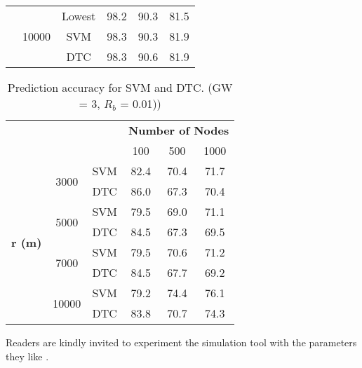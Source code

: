 \begin{table}[h]
\begin{tabular}{|c|c|c|c|c|c|}
                                 & \multirow{3}{*}{10000} & Lowest & 98.2          & 90.3          & 81.5          \\ \cline{3-6}
                                 &                        & SVM    & 98.3          & 90.3          & 81.9          \\ \cline{3-6}
                                 &                        & DTC    & 98.3          & 90.6          & 81.9          \\ \hline
\end{tabular}
\end{table}

\begin{table}[h]
\centering
\caption{Prediction accuracy for SVM and DTC. (GW = 3, ${R_{b}}$ = 0.01))}
\label{table:prediction_accuracy}
\begin{tabular}{|c|c|c|c|c|c|}
\hline
\multicolumn{3}{|c|}{\multirow{2}{*}{}}                        & \multicolumn{3}{c|}{\textbf{Number of Nodes}} \\ \cline{4-6}
\multicolumn{3}{|c|}{}                                         & 100           & 500           & 1000          \\ \hline
\multirow{8}{*}{\textbf{r (m)}} & \multirow{2}{*}{3000}  & SVM & 82.4          & 70.4          & 71.7          \\ \cline{3-6}
                                &                        & DTC & 86.0          & 67.3          & 70.4          \\ \cline{2-6}

                                & \multirow{2}{*}{5000}  & SVM & 79.5          & 69.0          & 71.1          \\ \cline{3-6}
                                &                        & DTC & 84.5          & 67.3          & 69.5          \\ \cline{2-6}

                                & \multirow{2}{*}{7000}  & SVM & 79.5          & 70.6          & 71.2          \\ \cline{3-6}
                                &                        & DTC & 84.5          & 67.7          & 69.2          \\ \cline{2-6}

                                & \multirow{2}{*}{10000} & SVM & 79.2          & 74.4          & 76.1          \\ \cline{3-6}
                                &                        & DTC & 83.8          & 70.7          & 74.3          \\ \hline
\end{tabular}
\end{table}


Readers are kindly invited to experiment the simulation tool with the parameters they like \cite{tugrul_yatagan_2019_2579366}.
